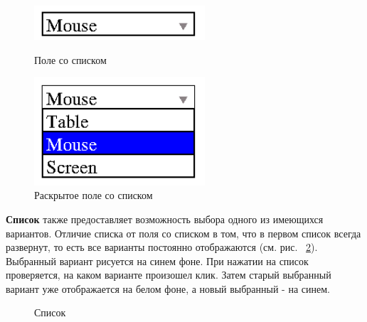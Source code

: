\documentclass[14pt]{extarticle}
\begin{document}
		\begin{figure}[h!]
		\begin{center}
		\begin{minipage}[h]{0.4\linewidth}
		\includegraphics[width=180pt]{pictures/comboBox1.png}
		\caption{ Поле со списком} %
		\label{combobox1} %
		\end{minipage}
		\hfill 
		\begin{minipage}[h!]{0.4\linewidth}
		\includegraphics[width=180pt]{pictures/comboBox2.png}
		\caption{Раскрытое поле со списком}
		\label{combobox2}
		\end{minipage}
		\end{center}
		\end{figure}
		
	\textbf{Список} также предоставляет возможность выбора одного из имеющихся вариантов. Отличие списка от поля со списком в том, что в первом список всегда развернут, то есть все варианты постоянно отображаются (см. рис. ~\ref{listbox}). Выбранный вариант рисуется на синем фоне. При нажатии на список проверяется, на каком варианте произошел клик. Затем старый выбранный вариант уже отображается на белом фоне, а новый выбранный - на синем. 
		\begin{figure}[h]
		\caption{Список}
		\label{listbox}
		\end{figure}	
	
\end{document}
